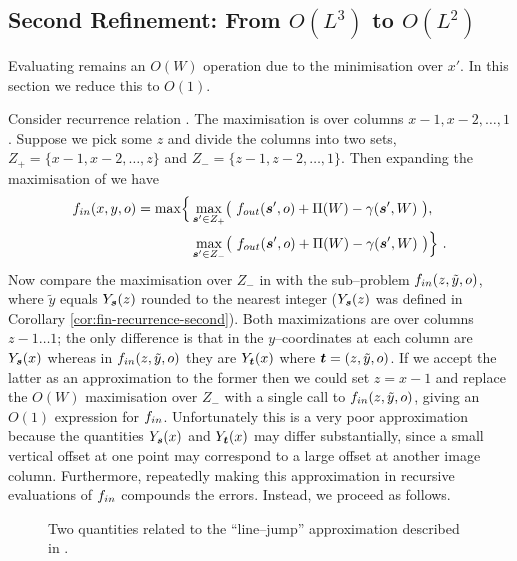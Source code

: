 \subsection{Second Refinement: From $O(L^3)$ to $O(L^2)$}
\label{sec:line-jump}
Evaluating  remains an $O(W)$ operation
due to the minimisation over $x'$. In this section we reduce this
to $O(1)$.

Consider recurrence relation . The
maximisation is over columns $x-1,x-2,\ldots,1$. Suppose we pick
some $z$ and divide the columns into two sets,
$Z_+=\{x-1,x-2,\ldots,z\}$ and $Z_-=\{z-1,z-2,\ldots,1\}$. Then
expanding the maximisation of  we have
\begin{equation}
  \label{eq:fin-split}
  \begin{split}
    \SubProbIN(x,y,\WallOrient) =
    \max\Bigl\{
      &\max_{\State'\in Z_+}\limits \bigl(~
        \SubProbOUT(\State',\WallOrient)
        + \WallPayoff(\Wall) - \CornerPenalty(\State',\Wall)~
      \bigr),\\
      &\max_{\State'\in Z_-}\limits \bigl(~
        \SubProbOUT(\State',\WallOrient)
        + \WallPayoff(\Wall) - \CornerPenalty(\State',\Wall)~
      \bigr)
    \Bigr\} ~.
  \end{split}
\end{equation}
Now compare the maximisation over $Z_-$ in  with the
sub--problem $\SubProbIN(z,\tilde{y},o)$, where $\tilde{y}$ equals
$Y_{\State}(z)$ rounded to the nearest integer ($Y_{\State}(z)$ was
defined in Corollary \ref{cor:fin-recurrence-second}). Both
maximizations are over columns $z-1 \ldots 1$; the only difference is
that in  the $y$--coordinates at each column are
$Y_{\State}(x)$ whereas in $\SubProbIN(z,\tilde{y},o)$ they are
$Y_{\OtherState}(x)$ where $\OtherState=(z,\tilde{y},o)$. If we accept
the latter as an approximation to the former then we could set $z=x-1$
and replace the $O(W)$ maximisation over $Z_-$ with a single call to
$\SubProbIN(z,\tilde{y},\WallOrient)$, giving an $O(1)$ expression for
$\SubProbIN$. Unfortunately this is a very poor approximation because
the quantities $Y_{\State}(x)$ and $Y_{\OtherState}(x)$ may differ
substantially, since a small vertical offset at one point may
correspond to a large offset at another image column. Furthermore,
repeatedly making this approximation in recursive evaluations of
$\SubProbIN$ compounds the errors. Instead, we proceed as follows.

\begin{figure}[tb]%
  \centering
  \qquad
  \caption{Two quantities related to the ``line--jump'' approximation
    described in .}
  \label{fig:line-jump}
\end{figure}

